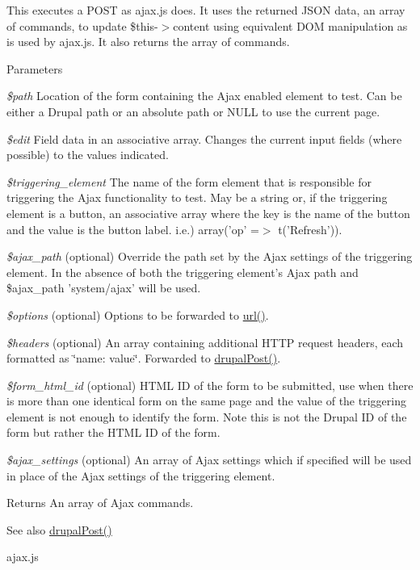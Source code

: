 This executes a POST as ajax.js does. It uses the returned JSON data, an array of commands, to update \$this-\/$>$content using equivalent DOM manipulation as is used by ajax.js. It also returns the array of commands.


\begin{DoxyParams}{Parameters}
\item[{\em \$path}]Location of the form containing the Ajax enabled element to test. Can be either a Drupal path or an absolute path or NULL to use the current page. \item[{\em \$edit}]Field data in an associative array. Changes the current input fields (where possible) to the values indicated. \item[{\em \$triggering\_\-element}]The name of the form element that is responsible for triggering the Ajax functionality to test. May be a string or, if the triggering element is a button, an associative array where the key is the name of the button and the value is the button label. i.e.) array('op' =$>$ t('Refresh')). \item[{\em \$ajax\_\-path}](optional) Override the path set by the Ajax settings of the triggering element. In the absence of both the triggering element's Ajax path and \$ajax\_\-path 'system/ajax' will be used. \item[{\em \$options}](optional) Options to be forwarded to \hyperlink{common_8inc_a43b2a0594431556db49df980801d8807}{url()}. \item[{\em \$headers}](optional) An array containing additional HTTP request headers, each formatted as \char`\"{}name: value\char`\"{}. Forwarded to \hyperlink{classDrupalWebTestCase_acbc229f81258bb985a1f011a4a5a99a3}{drupalPost()}. \item[{\em \$form\_\-html\_\-id}](optional) HTML ID of the form to be submitted, use when there is more than one identical form on the same page and the value of the triggering element is not enough to identify the form. Note this is not the Drupal ID of the form but rather the HTML ID of the form. \item[{\em \$ajax\_\-settings}](optional) An array of Ajax settings which if specified will be used in place of the Ajax settings of the triggering element.\end{DoxyParams}
\begin{DoxyReturn}{Returns}
An array of Ajax commands.
\end{DoxyReturn}
\begin{DoxySeeAlso}{See also}
\hyperlink{classDrupalWebTestCase_acbc229f81258bb985a1f011a4a5a99a3}{drupalPost()} 

ajax.js 
\end{DoxySeeAlso}
